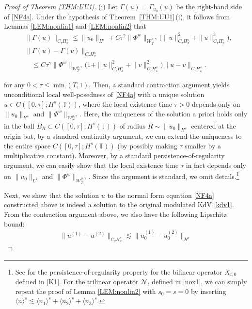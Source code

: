 \documentclass[letterpaper, 11pt,  reqno]{amsart}
\newcommand{\1}{\hspace{0.5mm}\text{I}\hspace{0.5mm}}
\newcommand{\noi}{\noindent}
\newcommand{\T}{\mathbb{T}}
\newcommand{\g}{\gamma}
\newcommand{\G}{\Gamma}
\newcommand{\les}{\lesssim}
\newcommand{\jb}[1]
{\langle #1 \rangle}
\newcommand{\NN}{\mathcal{N}}
\newcommand{\W}{\mathcal{W}}
\numberwithin{equation}{section}
\numberwithin{theorem}{section}
\begin{document}
\begin{proof}[Proof of Theorem \ref{THM:UU1}]
(i) Let $\G(u) = \G_{u_0}(u)$ be the right-hand side of \eqref{NF4a}.
Under the hypothesis of Theorem~\ref{THM:UU1}\,(i), 
it follows from 
 Lemmas \ref{LEM:nonlin1} and 
\ref{LEM:nonlin2}
that 
\begin{align*}
& \| \G(u) \|_{C_\tau H^s_x}
 \le \| u_0\|_{H^s}
+ C\tau^\g
  \|\Phi^w\|_{  \W^{\rho,\g}_T} 
  \Big(\|u\|_{C_\tau H^s_x}^2 + \|u\|_{C_\tau H^s_x}^3\Big),\\
& \| \G(u)  - \G(v) \|_{C_\tau  H^s_x}\\
& \quad \le 
 C\tau^\g
  \|\Phi^w\|_{  \W^{\rho,\g}_T} 
\Big(1+ \|u\|_{C_\tau H^s_x}^2 + \|v\|_{C_\tau H^s_x}^2\Big) 
\|u- v \|_{C_\tau H^s_x}.
\end{align*}


\noi
for any $0 < \tau \le \min(T, 1)$.
Then, 
 a standard contraction argument
yields unconditional  local well-posedness
of \eqref{NF4a}
with a unique solution $u \in C([0, \tau]; H^s(\T))$, 
where the local existence time 
$\tau > 0$
depends only on 
$\|u_0\|_{H^s}$ and   $\|\Phi^w\|_{  \W^{\rho,\g}_T} $.
Here, the uniqueness of the solution a priori holds only in the ball 
$B_R \subset C([0, \tau]; H^s(\T))$
of radius $R \sim \|u_0\|_{H^s}$ centered at the origin
but, by a standard continuity argument, 
we can extend the uniqueness to the entire space $C([0, \tau]; H^s(\T))$
(by possibly making $\tau$ smaller by a multiplicative constant).
Moreover, by a standard persistence-of-regularity argument, 
we can easily show that the local existence time $\tau$
in fact depends only on 
$\|u_0\|_{L^2}$ and   $\|\Phi^w\|_{  \W^{\rho,\g}_T} $.
Since the argument is standard, we omit details.\footnote{See \cite[Proposition 4.1\,(i)]{CGLLO1}
for the persistence-of-regularity property for the bilinear operator $X_{t, 0}$ defined in \eqref{K1}.
For the trilinear operator $\NN_t$ defined in \eqref{nox1}, 
we can simply repeat the proof of Lemma \ref{LEM:nonlin2}
with $s_0 = s = 0$
by inserting $\jb{n}^s \les \jb{n_1}^s + \jb{n_2}^s+ \jb{n_3}^s$.
}




Next, we show that the solution $u$ to the normal form equation \eqref{NF4a}
constructed above 
is indeed a solution to the original modulated KdV \eqref{kdv1}.
From the contraction argument above, 
we also have the following Lipschitz bound:
\begin{align}
\| u^{(1)} - u^{(2)}\|_{C_\tau H^s_x}
\les \| u_0^{(1)} - u_0^{(2)}\|_{H^s}
\label{NF4c}
\end{align}


\end{proof}
\end{document}
